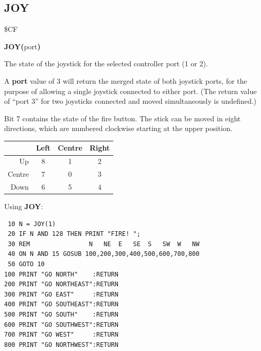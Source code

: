 \subsection{JOY}
\begin{description}[leftmargin=2cm,style=nextline]
\item [Token:] \$CF
\item [Format:] {\bf JOY(}port{\bf)}
\item [Returns:] The state of the
               joystick for the selected controller port (1 or 2).

               A {\bf port} value of 3 will return the merged state of both joystick ports, for the purpose of allowing a single joystick connected to either port. (The return value of ``port 3'' for two joysticks connected and moved simultaneously is undefined.)

               Bit 7 contains the state of the fire button.
               The stick can be moved in eight directions, which
               are numbered clockwise starting at the upper position.
\begin{center}
{\setlength{\tabcolsep}{1mm}
\begin{tabular}{|r|c|c|c|}
\hline
&  {\bf Left}  & {\bf Centre} & {\bf Right} \\
\hline
Up     &  8 &    1  & 2 \\
Centre &  7 &    0  & 3 \\
Down   &  6 &    5  & 4 \\
\hline
\end{tabular}
}
\end{center}

\item [Example:] Using {\bf JOY}:
\begin{tcolorbox}[colback=black,coltext=white]
\verbatimfont{\codefont}
\begin{verbatim}
 10 N = JOY(1)
 20 IF N AND 128 THEN PRINT "FIRE! ";
 30 REM                N   NE  E   SE  S   SW  W   NW
 40 ON N AND 15 GOSUB 100,200,300,400,500,600,700,800
 50 GOTO 10
100 PRINT "GO NORTH"    :RETURN
200 PRINT "GO NORTHEAST":RETURN
300 PRINT "GO EAST"     :RETURN
400 PRINT "GO SOUTHEAST":RETURN
500 PRINT "GO SOUTH"    :RETURN
600 PRINT "GO SOUTHWEST":RETURN
700 PRINT "GO WEST"     :RETURN
800 PRINT "GO NORTHWEST":RETURN
\end{verbatim}
\end{tcolorbox}
\end{description}

